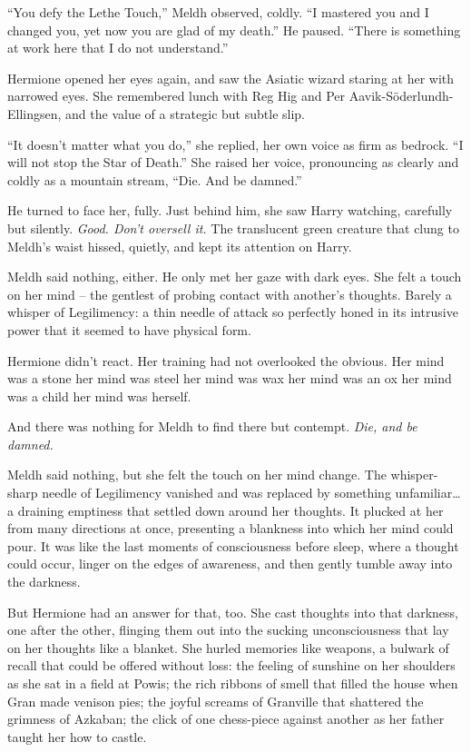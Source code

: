 ``You defy the Lethe Touch,'' Meldh observed, coldly. ``I mastered you
and I changed you, yet now you are glad of my death.'' He paused.
``There is something at work here that I do not understand.''

Hermione opened her eyes again, and saw the Asiatic wizard staring at
her with narrowed eyes. She remembered lunch with Reg Hig and Per
Aavik-Söderlundh-Ellingsen, and the value of a strategic but subtle
slip.

``It doesn't matter what you do,'' she replied, her own voice as firm as
bedrock. ``I will not stop the Star of Death.'' She raised her voice,
pronouncing as clearly and coldly as a mountain stream, ``Die. And be
damned.''

He turned to face her, fully. Just behind him, she saw Harry watching,
carefully but silently. \emph{Good. Don't oversell it.} The translucent
green creature that clung to Meldh's waist hissed, quietly, and kept its
attention on Harry.

Meldh said nothing, either. He only met her gaze with dark eyes. She
felt a touch on her mind -- the gentlest of probing contact with
another's thoughts. Barely a whisper of Legilimency: a thin needle of
attack so perfectly honed in its intrusive power that it seemed to have
physical form.

Hermione didn't react. Her training had not overlooked the obvious. Her
mind was a stone her mind was steel her mind was wax her mind was an ox
her mind was a child her mind was herself.

And there was nothing for Meldh to find there but contempt. \emph{Die,
and be damned.}

Meldh said nothing, but she felt the touch on her mind change. The
whisper-sharp needle of Legilimency vanished and was replaced by
something unfamiliar\ldots{} a draining emptiness that settled down
around her thoughts. It plucked at her from many directions at once,
presenting a blankness into which her mind could pour. It was like the
last moments of consciousness before sleep, where a thought could occur,
linger on the edges of awareness, and then gently tumble away into the
darkness.

But Hermione had an answer for that, too. She cast thoughts into that
darkness, one after the other, flinging them out into the sucking
unconsciousness that lay on her thoughts like a blanket. She hurled
memories like weapons, a bulwark of recall that could be offered without
loss: the feeling of sunshine on her shoulders as she sat in a field at
Powis; the rich ribbons of smell that filled the house when Gran made
venison pies; the joyful screams of Granville that shattered the
grimness of Azkaban; the click of one chess-piece against another as her
father taught her how to castle.

